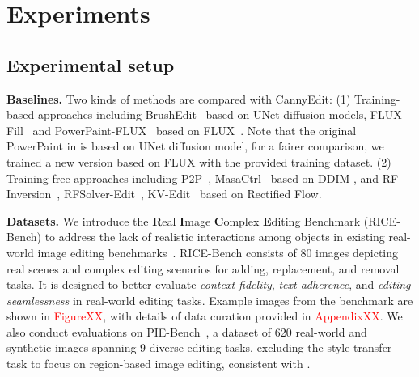 \documentclass{article}
\begin{document}





\section{Experiments}
\label{Sec:experiment}


\subsection{Experimental setup}

\textbf{Baselines.} Two kinds of methods are compared with CannyEdit: (1) Training-based approaches including BrushEdit~\cite{li2024brushedit} based on UNet diffusion models, FLUX Fill~\cite{blackforest2024FLUX} and PowerPaint-FLUX~\cite{zhuang2023task} based on FLUX~\cite{blackforest2024FLUX}. Note that the original PowerPaint in \cite{blackforest2024FLUX} is based on UNet diffusion model, for a fairer comparison, we trained a new version based on FLUX with the provided training dataset. (2) Training-free approaches including P2P~\cite{hertz2022prompt}, MasaCtrl~\cite{cao2023masactrl} based on DDIM \citep{song2022denoisingdiffusionimplicitmodels}, and RF-Inversion~\cite{rout2024semantic}, RFSolver-Edit~\cite{wang2024taming}, KV-Edit~\cite{zhu2025kv} based on Rectified
Flow. %

\textbf{Datasets.} We introduce the \textbf{R}eal \textbf{I}mage \textbf{C}omplex \textbf{E}diting Benchmark ({RICE-Bench}) to address the lack of realistic interactions among objects in existing real-world image editing benchmarks~\citep{sheynin2024emu,gu2024multi}. RICE-Bench consists of 80 images depicting real scenes and complex editing scenarios for adding, replacement, and removal tasks. It is designed to better evaluate \textit{context fidelity}, \textit{text adherence}, and \textit{editing seamlessness} in real-world editing tasks. Example images from the benchmark are shown in \textcolor{red}{FigureXX}, with details of data curation provided in \textcolor{red}{AppendixXX}. We also conduct evaluations on PIE-Bench~\cite{ju2024pnp}, a dataset of 620 real-world and synthetic images spanning 9 diverse editing tasks, excluding the style transfer task to focus on region-based image editing, consistent with \cite{li2024brushedit, xu2023infedit, zhu2025kv}.
\end{document}
